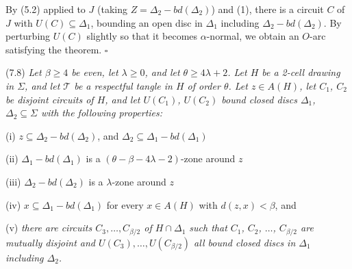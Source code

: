 By (5.2) applied to $J$ (taking $Z = \Delta_2 - bd(\Delta_2)$) and (1), there is a circuit $C$ of $J$ with $U(C) \subseteq \Delta_1$, bounding an open disc in $\Delta_1$ including $\Delta_2 - bd(\Delta_2)$. By perturbing $U(C)$ slightly so that it becomes $\alpha$-normal, we obtain an $O$-arc satisfying the theorem. $\square$

\stmt
(7.8) \textit{Let $\beta \ge 4$ be even, let $\lambda \ge 0$, and let $\theta \ge 4\lambda + 2$. Let $H$ be a 2-cell drawing in $\Sigma$, and let $\mathscr{T}$ be a respectful tangle in $H$ of order $\theta$. Let $z \in A(H)$, let $C_1$, $C_2$ be disjoint circuits of $H$, and let $U(C_1)$, $U(C_2)$ bound closed discs $\Delta_1$, $\Delta_2 \subseteq \Sigma$ with the following properties:}

\hspace*{12pt}(i) $z \subseteq \Delta_2 - bd(\Delta_2)$, and $\Delta_2 \subseteq \Delta_1 - bd(\Delta_1)$

\hspace*{12pt}(ii) $\Delta_1 - bd(\Delta_1)$ is a $(\theta - \beta - 4\lambda - 2)$-zone around $z$

\hspace*{12pt}(iii) $\Delta_2 - bd(\Delta_2)$ is a $\lambda$-zone around $z$

\hspace*{12pt}(iv) $x \subseteq \Delta_1 - bd(\Delta_1)$ for every $x \in A(H)$ with $d(z, x) < \beta$, and

\hspace*{12pt}(v) \textit{there are circuits $C_3, \dots, C_{\beta/2}$ of $H \cap \Delta_1$ such that $C_1$, $C_2$, $\dots$, $C_{\beta/2}$ are mutually disjoint and $U(C_3), \dots, U(C_{\beta/2})$ all bound closed discs in $\Delta_1$ including $\Delta_2$.}
